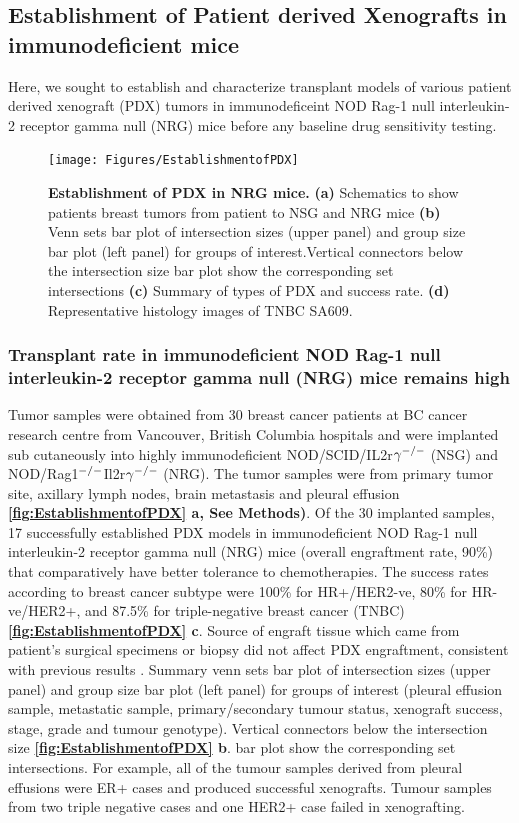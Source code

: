 \subsection{Establishment of Patient derived Xenografts in immunodeficient mice}

Here, we sought to establish and characterize transplant models of various patient derived xenograft (PDX) tumors in immunodeficeint NOD Rag-1 null interleukin-2 receptor gamma null (NRG) mice before any baseline drug sensitivity testing.

\begin{figure}
	\centering
	\texttt{[image: Figures/EstablishmentofPDX]}
	\caption[Establishment of PDX in NRG mice]
	{\small
	    \textbf{Establishment of PDX in NRG mice.}
	    \textbf{(a)} Schematics to show patients breast tumors from patient to NSG and NRG mice 
	    \textbf{(b)} Venn sets bar plot of intersection sizes (upper panel) and group size bar plot  (left panel) for groups of interest.Vertical connectors below the intersection size
bar plot show the corresponding set intersections
	    \textbf{(c)} Summary of types of PDX and success rate.
	     \textbf{(d)} Representative histology images of TNBC SA609. 
	}
	\label{fig:EstablishmentofPDX}
\end{figure}

\subsubsection{Transplant rate in immunodeficient NOD Rag-1 null interleukin-2 receptor gamma null (NRG) mice  remains high}
Tumor samples were obtained from 30 breast cancer patients at BC cancer research centre from Vancouver, British Columbia hospitals and were implanted sub cutaneously into highly immunodeficient NOD/SCID/IL2r$\gamma^{\small{-/-}}$ (NSG) and NOD/Rag1$^{\small{-/-}}$Il2r$\gamma ^{\small{-/-}}$ (NRG)\cite{pearson2008non}. The tumor samples were from primary tumor site, axillary lymph nodes, brain metastasis and pleural effusion \textbf{\autoref{fig:EstablishmentofPDX} a, See Methods)}.
Of the 30 implanted samples, 17 successfully established PDX models in immunodeficient NOD Rag-1 null interleukin-2 receptor gamma null (NRG) mice (overall engraftment rate, 90\%) that comparatively have better tolerance to chemotherapies. The success rates according to breast cancer subtype were 100\% for HR+/HER2-ve, 80\% for HR-ve/HER2+, and 87.5\% for triple-negative breast cancer (TNBC) \textbf{\autoref{fig:EstablishmentofPDX} c}. Source of engraft tissue which came from patient's surgical specimens or biopsy did not affect PDX engraftment, consistent with previous results \cite{ryu2019integrative}. Summary venn sets bar plot of intersection sizes (upper panel) and group size bar plot (left panel) for groups of interest (pleural effusion sample, metastatic sample, primary/secondary tumour status, xenograft success, stage, grade and tumour genotype). Vertical connectors below the intersection size \textbf{\autoref{fig:EstablishmentofPDX} b}.
bar plot show the corresponding set intersections. For example, all of the tumour samples derived from pleural effusions were ER+ cases and produced successful xenografts. Tumour samples from two triple negative cases and one HER2+ case failed in xenografting.


